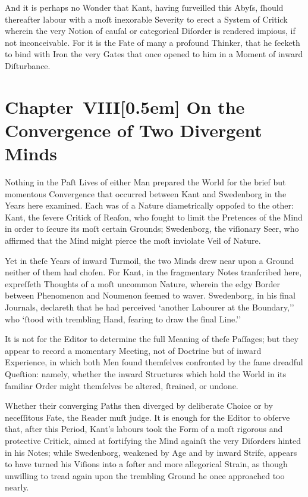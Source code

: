 \documentclass[12pt]{book}
\begin{document}
And it is perhaps no Wonder that Kant, having ſurveilled this Abyſs, ſhould thereafter labour with a moſt inexorable Severity to erect a System of Critick wherein the very Notion of cauſal or categorical Diſorder is rendered impious, if not inconceivable. For it is the Fate of many a profound Thinker, that he ſeeketh to bind with Iron the very Gates that once opened to him in a Moment of inward Diſturbance.


\chapter*{Chapter~VIII[0.5em]
On the Convergence of Two Divergent Minds}


Nothing in the Paſt Lives of either Man prepared the World for the brief but momentous Convergence that occurred between Kant and Swedenborg in the Years here examined. Each was of a Nature diametrically oppoſed to the other: Kant, the ſevere Critick of Reaſon, who ſought to limit the Pretences of the Mind in order to ſecure its moſt certain Grounds; Swedenborg, the viſionary Seer, who affirmed that the Mind might pierce the moſt inviolate Veil of Nature.

Yet in theſe Years of inward Turmoil, the two Minds drew near upon a Ground neither of them had choſen. For Kant, in the fragmentary Notes tranſcribed here, expreſſeth Thoughts of a moſt uncommon Nature, wherein the edgy Border between Phenomenon and Noumenon ſeemed to waver. Swedenborg, in his final Journals, declareth that he had perceived `another Labourer at the Boundary,'' who `ſtood with trembling Hand, fearing to draw the final Line.''

It is not for the Editor to determine the full Meaning of theſe Paſſages; but they appear to record a momentary Meeting, not of Doctrine but of inward Experience, in which both Men found themſelves confronted by the ſame dreadful Queſtion: namely, whether the inward Structures which hold the World in its familiar Order might themſelves be altered, ſtrained, or undone.

Whether their converging Paths then diverged by deliberate Choice or by neceſſitous Fate, the Reader muſt judge. It is enough for the Editor to obſerve that, after this Period, Kant’s labours took the Form of a moſt rigorous and protective Critick, aimed at fortifying the Mind againſt the very Diſorders hinted in his Notes; while Swedenborg, weakened by Age and by inward Strife, appears to have turned his Viſions into a ſofter and more allegorical Strain, as though unwilling to tread again upon the trembling Ground he once approached too nearly.
\end{document}
